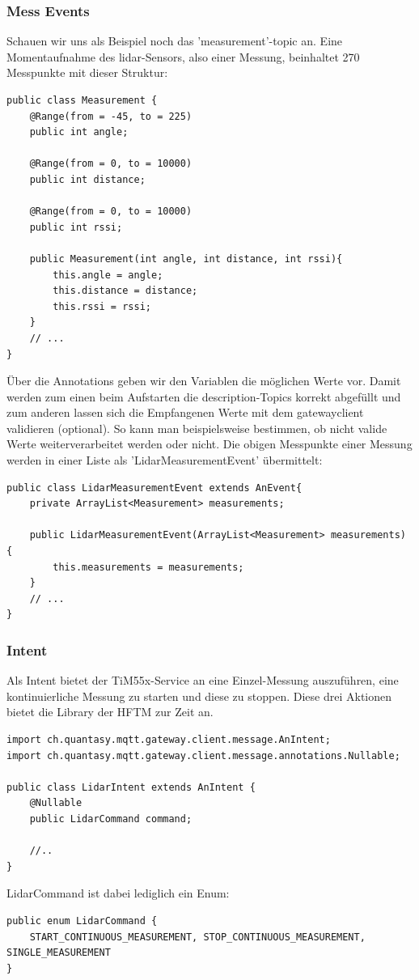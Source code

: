 \subsubsection{Mess Events}
Schauen wir uns als Beispiel noch das 'measurement'-\Gls{topic} an. Eine Momentaufnahme des \acrshort{lidar}-Sensors, also einer Messung, beinhaltet 270 Messpunkte mit dieser Struktur:
\begin{lstlisting}[caption={TiM55x-Service - Struktur der Messpunkte},label={lst:lidar_measurement}]
public class Measurement {
    @Range(from = -45, to = 225)
    public int angle;
    
    @Range(from = 0, to = 10000)
    public int distance;
    
    @Range(from = 0, to = 10000)
    public int rssi;

    public Measurement(int angle, int distance, int rssi){
        this.angle = angle;
        this.distance = distance;
        this.rssi = rssi;
    }
    // ...
}
\end{lstlisting}
Über die Annotations geben wir den Variablen die möglichen Werte vor. Damit werden zum einen beim Aufstarten die \Gls{description}-Topics korrekt abgefüllt und zum anderen lassen sich die Empfangenen Werte mit dem \Gls{gatewayclient} validieren (optional). So kann man beispielsweise bestimmen, ob nicht valide Werte weiterverarbeitet werden oder nicht.
Die obigen Messpunkte einer Messung werden in einer Liste als 'LidarMeasurementEvent' übermittelt:
\begin{lstlisting}[caption={TiM55x-Service - Struktur des 'LidarMeasurementEvent'},label={lst:lidar_measurementevent}]
public class LidarMeasurementEvent extends AnEvent{
    private ArrayList<Measurement> measurements;
    
    public LidarMeasurementEvent(ArrayList<Measurement> measurements) {
        this.measurements = measurements;
    }
    // ...
}
\end{lstlisting}

\subsubsection{Intent}
Als Intent bietet der TiM55x-Service an eine Einzel-Messung auszuführen, eine kontinuierliche Messung zu starten und diese zu stoppen. Diese drei Aktionen bietet die Library der HFTM zur Zeit an.
\begin{lstlisting}
import ch.quantasy.mqtt.gateway.client.message.AnIntent;
import ch.quantasy.mqtt.gateway.client.message.annotations.Nullable;

public class LidarIntent extends AnIntent {
    @Nullable
    public LidarCommand command;
    
    //..
}
\end{lstlisting}
LidarCommand ist dabei lediglich ein Enum:
\begin{lstlisting}
public enum LidarCommand {
    START_CONTINUOUS_MEASUREMENT, STOP_CONTINUOUS_MEASUREMENT, SINGLE_MEASUREMENT
}
\end{lstlisting}

